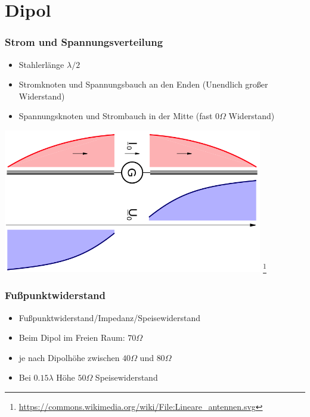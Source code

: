 \section*{Dipol}

\begin{frame}
    \frametitle{Strom und Spannungsverteilung}
	\begin{itemize}
		\item Stahlerlänge $\lambda / 2$
		\item Stromknoten und Spannungsbauch an den Enden (Unendlich großer Widerstand)
        \item Spannungsknoten und Strombauch in der Mitte (fast $0 \Omega$ Widerstand)
    \end{itemize}
    \begin{center}
        \includegraphics[width=0.85\textwidth]{e11/DipolUI.png}
        \footnote{\tiny \url{https://commons.wikimedia.org/wiki/File:Lineare_antennen.svg}}
	\end{center}
\end{frame}

\begin{frame}
    \frametitle{Fußpunktwiderstand}
    \begin{center}
	\begin{itemize}
		\item Fußpunktwiderstand/Impedanz/Speisewiderstand
		\item Beim Dipol im Freien Raum: $70 \Omega$
		\item je nach Dipolhöhe zwischen $40  \Omega$ und $80  \Omega$
		\item  Bei $0.15 \lambda$ Höhe $50  \Omega$ Speisewiderstand 
    \end{itemize}
 	\end{center}
\end{frame}

